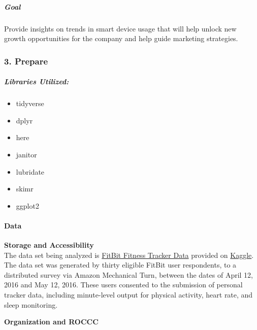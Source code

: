 \documentclass[
]{article}
\providecommand{\tightlist}{%
  \setlength{\itemsep}{0pt}\setlength{\parskip}{0pt}}
\begin{document}
\subparagraph{\texorpdfstring{\textbf{Goal}}{Goal}}\label{goal}

Provide insights on trends in smart device usage that will help unlock
new growth opportunities for the company and help guide marketing
strategies.

\subsubsection{\texorpdfstring{\textbf{3.
Prepare}}{3. Prepare}}\label{prepare}

\subparagraph{Libraries Utilized:}\label{libraries-utilized}

\begin{itemize}
\tightlist
\item
  tidyverse
\item
  dplyr
\item
  here
\item
  janitor
\item
  lubridate
\item
  skimr
\item
  ggplot2
\end{itemize}

\paragraph{\texorpdfstring{\textbf{Data}}{Data}}\label{data}

\textbf{Storage and Accessibility}\\

The data set being analyzed is
\href{https://www.kaggle.com/datasets/arashnic/fitbit}{FitBit Fitness
Tracker Data} provided on \href{https://www.kaggle.com}{Kaggle}. The
data set was generated by thirty eligible FitBit user respondents, to a
distributed survey via Amazon Mechanical Turn, between the dates of
April 12, 2016 and May 12, 2016. These users consented to the submission
of personal tracker data, including minute-level output for physical
activity, heart rate, and sleep monitoring.

\textbf{Organization and ROCCC}\\
\end{document}
